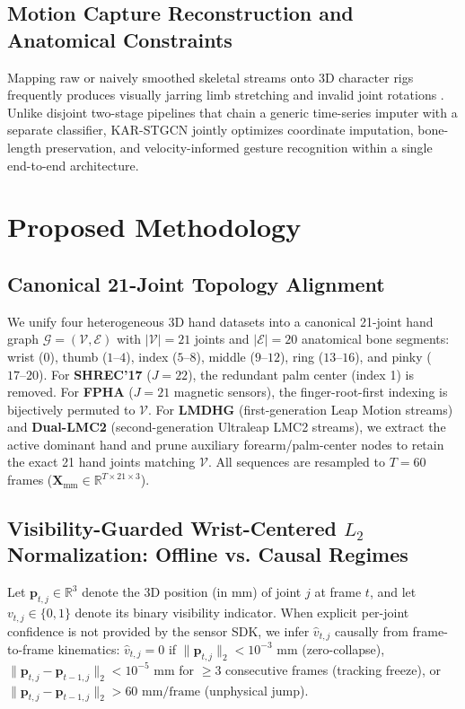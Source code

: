 \documentclass[10pt,twocolumn]{article}
\begin{document}
\subsection{Motion Capture Reconstruction and Anatomical Constraints}
Mapping raw or naively smoothed skeletal streams onto 3D character rigs frequently produces visually jarring limb stretching and invalid joint rotations \cite{tirakoat2011optimized, noiumkar2013use}. Unlike disjoint two-stage pipelines that chain a generic time-series imputer with a separate classifier, KAR-STGCN jointly optimizes coordinate imputation, bone-length preservation, and velocity-informed gesture recognition within a single end-to-end architecture.

\section{Proposed Methodology}
\subsection{Canonical 21-Joint Topology Alignment}
We unify four heterogeneous 3D hand datasets into a canonical 21-joint hand graph $\mathcal{G} = (\mathcal{V}, \mathcal{E})$ with $|\mathcal{V}|=21$ joints and $|\mathcal{E}|=20$ anatomical bone segments: wrist ($0$), thumb ($1\text{--}4$), index ($5\text{--}8$), middle ($9\text{--}12$), ring ($13\text{--}16$), and pinky ($17\text{--}20$). For \textbf{SHREC'17} \cite{de2017shrec} ($J=22$), the redundant palm center (index 1) is removed. For \textbf{FPHA} \cite{garcia2018first} ($J=21$ magnetic sensors), the finger-root-first indexing is bijectively permuted to $\mathcal{V}$. For \textbf{LMDHG} \cite{boulahia2017dynamic} (first-generation Leap Motion streams) and \textbf{Dual-LMC2} \cite{gilmartin2024duallmc2} (second-generation Ultraleap LMC2 streams), we extract the active dominant hand and prune auxiliary forearm/palm-center nodes to retain the exact 21 hand joints matching $\mathcal{V}$. All sequences are resampled to $T=60$ frames ($\mathbf{X}_{\text{mm}} \in \mathbb{R}^{T \times 21 \times 3}$).

\subsection{Visibility-Guarded Wrist-Centered $L_2$ Normalization: Offline vs. Causal Regimes}
Let $\mathbf{p}_{t,j} \in \mathbb{R}^3$ denote the 3D position (in mm) of joint $j$ at frame $t$, and let $v_{t,j} \in \{0,1\}$ denote its binary visibility indicator. When explicit per-joint confidence is not provided by the sensor SDK, we infer $\hat{v}_{t,j}$ causally from frame-to-frame kinematics: $\hat{v}_{t,j}=0$ if $\|\mathbf{p}_{t,j}\|_2 < 10^{-3}\text{ mm}$ (zero-collapse), $\|\mathbf{p}_{t,j} - \mathbf{p}_{t-1,j}\|_2 < 10^{-5}\text{ mm}$ for $\ge 3$ consecutive frames (tracking freeze), or $\|\mathbf{p}_{t,j} - \mathbf{p}_{t-1,j}\|_2 > 60\text{ mm/frame}$ (unphysical jump).
\end{document}
